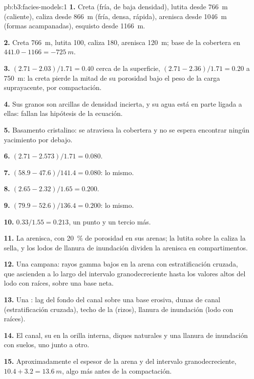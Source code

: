 \begin{solution}{pb:b3:facies-models:1}
\textbf{1.} Creta (fría, de baja densidad), lutita desde \qty{766}{m} (caliente), caliza desde
\qty{866}{m} (fría, densa, rápida), arenisca desde \qty{1046}{m} (formas acampanadas),
esquisto desde \qty{1166}{m}.

\textbf{2.} Creta \qty{766}{m}, lutita 100, caliza 180, arenisca
\qty{120}{m}; base de la cobertera en $441.0 - 1166 = \qty{-725}{m}$.

\textbf{3.} $(2.71 - 2.03)/1.71 = 0.40$ cerca de la superficie, $(2.71 -
2.36)/1.71 = 0.20$ a \qty{750}{m}: la creta pierde la mitad de su porosidad
bajo el peso de la carga suprayacente, por compactación.

\textbf{4.} Sus granos son arcillas de densidad incierta, y su agua está
en parte ligada a ellas: fallan las hipótesis de la ecuación.

\textbf{5.} Basamento cristalino: se atraviesa la cobertera y no se espera
encontrar ningún yacimiento por debajo.

\textbf{6.} $(2.71 - 2.573)/1.71 = 0.080$.

\textbf{7.} $(58.9 - 47.6)/141.4 = 0.080$: lo mismo.

\textbf{8.} $(2.65 - 2.32)/1.65 = 0.200$.

\textbf{9.} $(79.9 - 52.6)/136.4 = 0.200$: lo mismo.

\textbf{10.} $0.33/1.55 = 0.213$, un punto y un tercio más.

\textbf{11.} La arenisca, con \qty{20}{\percent} de porosidad en sus arenas;
la lutita sobre la caliza la sella, y los lodos de llanura de inundación dividen la
arenisca en compartimentos.

\textbf{12.} Una campana: rayos gamma bajos en la arena con estratificación cruzada, que ascienden
a lo largo del intervalo granodecreciente hasta los valores altos del lodo con raíces, sobre una base neta.

\textbf{13.} Una : lag del fondo del canal sobre una base erosiva,
dunas de canal (estratificación cruzada), techo de la  (rizos), llanura de
inundación (lodo con raíces).

\textbf{14.} El canal, su  en la orilla interna, diques naturales y una
llanura de inundación con suelos, uno junto a otro.

\textbf{15.} Aproximadamente el espesor de la arena y del intervalo granodecreciente, $10.4 + 3.2 =
\qty{13.6}{m}$, algo más antes de la compactación.


\end{solution}
